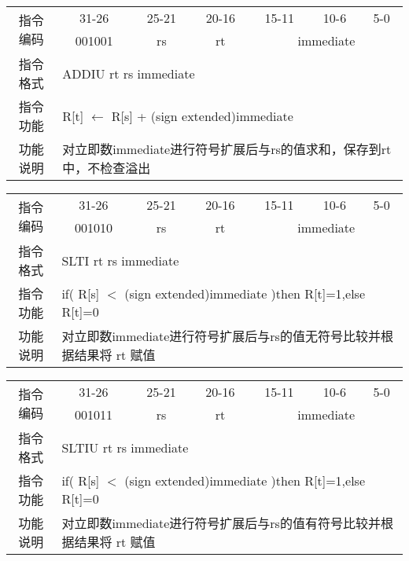\documentclass[a4paper,UTF8,fntef]{ctexart}
\begin{document}
	\begin{table}[!hbp]
		\centering
		\begin{tabular}{|c|c|c|c|c|c|c|}
		\hline
		\multirow{2}{*}{指令编码} & 31-26&25-21 & 20-16&15-11 &10-6 &5-0\\
		\cline{2-7} & 001001 & rs & rt & \multicolumn{3}{|c|}{immediate} \\
		\hline
		指令格式&\multicolumn{6}{|l|}{ADDIU rt rs immediate}\\
		\hline		
		指令功能&\multicolumn{6}{|l|}{R[t] $\leftarrow$ R[s] + (sign extended)immediate}\\
		\hline		
		功能说明&\multicolumn{6}{|l|}{对立即数immediate进行符号扩展后与rs的值求和，保存到rt中，不检查溢出}\\
		\hline
		\end{tabular}
	\end{table}
	\begin{table}[!hbp]
		\centering
		\begin{tabular}{|c|c|c|c|c|c|c|}
		\hline
		\multirow{2}{*}{指令编码} & 31-26&25-21 & 20-16&15-11 &10-6 &5-0\\
		\cline{2-7} & 001010 & rs & rt & \multicolumn{3}{|c|}{immediate} \\
		\hline
		指令格式&\multicolumn{6}{|l|}{SLTI rt rs immediate}\\
		\hline		
		指令功能&\multicolumn{6}{|l|}{if( R[s] $<$ (sign extended)immediate )then R[t]=1,else R[t]=0}\\
		\hline		
		功能说明&\multicolumn{6}{|l|}{对立即数immediate进行符号扩展后与rs的值无符号比较并根据结果将 rt 赋值}\\
		\hline
		\end{tabular}
	\end{table}
	\begin{table}[!hbp]
		\centering
		\begin{tabular}{|c|c|c|c|c|c|c|}
		\hline
		\multirow{2}{*}{指令编码} & 31-26&25-21 & 20-16&15-11 &10-6 &5-0\\
		\cline{2-7} & 001011 & rs & rt & \multicolumn{3}{|c|}{immediate} \\
		\hline
		指令格式&\multicolumn{6}{|l|}{SLTIU rt rs immediate}\\
		\hline		
		指令功能&\multicolumn{6}{|l|}{if( R[s] $<$ (sign extended)immediate )then R[t]=1,else R[t]=0}\\
		\hline		
		功能说明&\multicolumn{6}{|l|}{对立即数immediate进行符号扩展后与rs的值有符号比较并根据结果将 rt 赋值}\\
		\hline
		\end{tabular}
	\end{table}
\newpage
\end{document}

